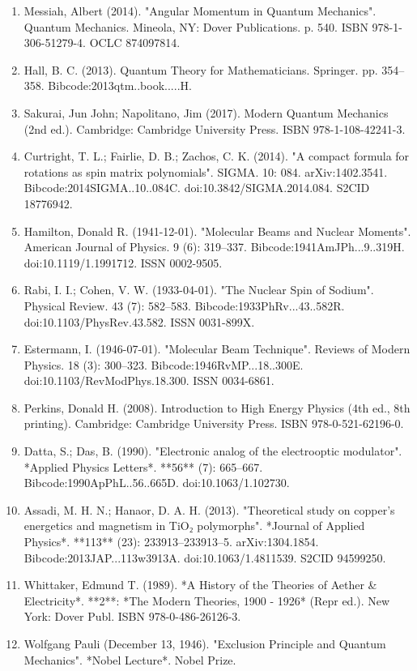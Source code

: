 \begin{enumerate}
\item Messiah, Albert (2014). "Angular Momentum in Quantum Mechanics". Quantum Mechanics. Mineola, NY: Dover Publications. p. 540. ISBN 978-1-306-51279-4. OCLC 874097814.  
\item Hall, B. C. (2013). Quantum Theory for Mathematicians. Springer. pp. 354–358. Bibcode:2013qtm..book.....H.  
\item Sakurai, Jun John; Napolitano, Jim (2017). Modern Quantum Mechanics (2nd ed.). Cambridge: Cambridge University Press. ISBN 978-1-108-42241-3.  
\item Curtright, T. L.; Fairlie, D. B.; Zachos, C. K. (2014). "A compact formula for rotations as spin matrix polynomials". SIGMA. 10: 084. arXiv:1402.3541. Bibcode:2014SIGMA..10..084C. doi:10.3842/SIGMA.2014.084. S2CID 18776942.  
\item Hamilton, Donald R. (1941-12-01). "Molecular Beams and Nuclear Moments". American Journal of Physics. 9 (6): 319–337. Bibcode:1941AmJPh...9..319H. doi:10.1119/1.1991712. ISSN 0002-9505.  
\item Rabi, I. I.; Cohen, V. W. (1933-04-01). "The Nuclear Spin of Sodium". Physical Review. 43 (7): 582–583. Bibcode:1933PhRv...43..582R. doi:10.1103/PhysRev.43.582. ISSN 0031-899X.  
\item Estermann, I. (1946-07-01). "Molecular Beam Technique". Reviews of Modern Physics. 18 (3): 300–323. Bibcode:1946RvMP...18..300E. doi:10.1103/RevModPhys.18.300. ISSN 0034-6861.  
\item Perkins, Donald H. (2008). Introduction to High Energy Physics (4th ed., 8th printing). Cambridge: Cambridge University Press. ISBN 978-0-521-62196-0.  
\item Datta, S.; Das, B. (1990). "Electronic analog of the electrooptic modulator". *Applied Physics Letters*. **56** (7): 665–667. Bibcode:1990ApPhL..56..665D. doi:10.1063/1.102730.  
\item Assadi, M. H. N.; Hanaor, D. A. H. (2013). "Theoretical study on copper's energetics and magnetism in TiO₂ polymorphs". *Journal of Applied Physics*. **113** (23): 233913–233913–5. arXiv:1304.1854. Bibcode:2013JAP...113w3913A. doi:10.1063/1.4811539. S2CID 94599250.  
\item Whittaker, Edmund T. (1989). *A History of the Theories of Aether & Electricity*. **2**: *The Modern Theories, 1900 - 1926* (Repr ed.). New York: Dover Publ. ISBN 978-0-486-26126-3.  
\item Wolfgang Pauli (December 13, 1946). "Exclusion Principle and Quantum Mechanics". *Nobel Lecture*. Nobel Prize.  

\end{enumerate}
